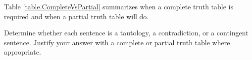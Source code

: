 Table \ref{table.CompleteVsPartial} summarizes when a complete truth table is required and when a partial truth table will do. 







\practiceproblems
\noindent\problempart \label{pr.TT.TTorC} Determine whether each sentence is a tautology, a contradiction, or a contingent sentence. Justify your answer with a complete or partial truth table where appropriate.


